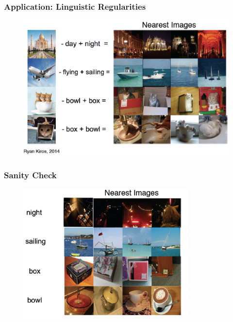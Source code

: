 \documentclass{beamer}
\begin{document}
\begin{frame}
\frametitle{Application: Linguistic Regularities}
\begin{figure}
      \includegraphics[width=1\textwidth]{figs/exp3.png}
\end{figure}
\end{frame}

\begin{frame}
\frametitle{Sanity Check}
\begin{figure}
      \includegraphics[width=0.8\textwidth]{figs/exp4.png}
\end{figure}
\end{frame}
\end{document}
